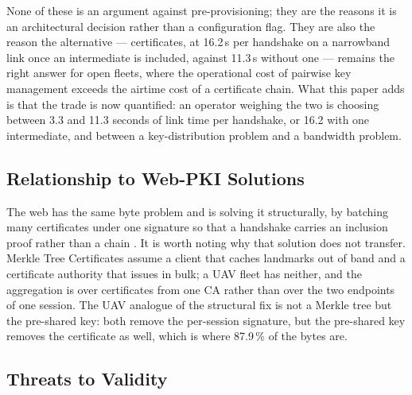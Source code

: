\documentclass[drones,article,submit,pdftex,moreauthors]{Definitions/mdpi}
\begin{document}
None of these is an argument against pre-provisioning; they are the
reasons it is an architectural decision rather than a configuration
flag. They are also the reason the alternative --- certificates, at
16.2\,s per handshake on a narrowband link once an intermediate is
included, against 11.3\,s without one --- remains the right answer for
open fleets, where the operational cost of pairwise key management
exceeds the airtime cost of a certificate chain. What this paper adds is
that the trade is now quantified: an operator weighing the two is
choosing between 3.3 and 11.3 seconds of link time per handshake, or
16.2 with one intermediate, and between a key-distribution problem and a
bandwidth problem.

\subsection{Relationship to Web-PKI Solutions}

The web has the same byte problem and is solving it structurally, by
batching many certificates under one signature so that a handshake
carries an inclusion proof rather than a chain
\cite{mtc2026draft,lec2026pq}. It is worth noting why that solution does not
transfer. Merkle Tree Certificates assume a client that caches
landmarks out of band and a certificate authority that issues in bulk;
a UAV fleet has neither, and the aggregation is over certificates from
one CA rather than over the two endpoints of one session. The UAV
analogue of the structural fix is not a Merkle tree but the pre-shared
key: both remove the per-session signature, but the pre-shared key
removes the certificate as well, which is where 87.9\,\% of the bytes
are.

\subsection{Threats to Validity}
\label{sec:threats}
\end{document}
